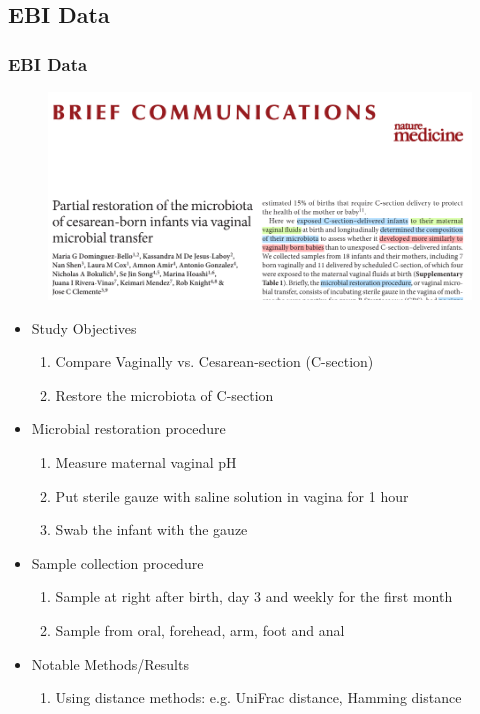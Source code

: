 \documentclass{beamer}
\begin{document}
    \subsection{EBI Data \protect\cite{validate1}}
    \begin{frame}[allowframebreaks]
        \frametitle{EBI Data}

        \begin{figure}
            \includegraphics[width=0.8 \linewidth]{figures/Literature/EBI/title.png}
        \end{figure}
        \newpage

        \begin{itemize}
            \item Study Objectives
            \begin{enumerate}
                \item Compare Vaginally vs. Cesarean-section (C-section)
                \item Restore the microbiota of C-section
            \end{enumerate}

            \item Microbial restoration procedure
            \begin{enumerate}
                \item Measure maternal vaginal pH
                \item Put sterile gauze with saline solution in vagina for 1 hour
                \item Swab the infant with the gauze
            \end{enumerate}

            \item Sample collection procedure
            \begin{enumerate}
                \item Sample at right after birth, day 3 and weekly for the first month
                \item Sample from oral, forehead, arm, foot and anal
            \end{enumerate}

            \item Notable Methods/Results
            \begin{enumerate}
                \item Using distance methods: e.g. UniFrac distance, Hamming distance
            \end{enumerate}
        \end{itemize}
    \end{frame}
\end{document}
